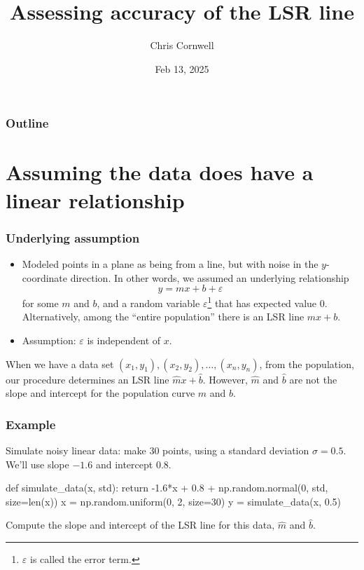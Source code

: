 \documentclass{beamer}
\author{Chris Cornwell}
\date{Feb 13, 2025}
\title{Assessing accuracy of the LSR line}
\newenvironment{codeblock}
    {\hfill\begin{beamerboxesrounded}[lower=codecol, width=0.8\textwidth]
    \medskip

    }
    { 
    \end{beamerboxesrounded}\hfill
    }
\theoremstyle{example}
\begin{document}
\begin{frame}
\titlepage
\end{frame}

\begin{frame}
\frametitle{Outline}
\tableofcontents
\end{frame}

\section{Assuming the data does have a linear relationship}

\begin{frame}
\frametitle{Underlying assumption}
\begin{itemize}
    \item Modeled points in a plane as being from a line, but with noise in the $y$-coordinate direction. In other words, we assumed an underlying relationship 
        \[y = mx + b + \varepsilon\]
    for some $m$ and $b$, and a random variable $\varepsilon$\footnote{$\varepsilon$ is called the error term.} that has expected value 0. Alternatively, among the ``entire population'' there is an LSR line $mx+b$. 
    \pause
    \item Assumption: $\varepsilon$ is independent of $x$.
\end{itemize}

When we have a data set $(x_1,y_1), (x_2,y_2), \ldots, (x_n,y_n)$, from the population, our procedure determines an LSR line $\hat{m}x + \hat{b}$. However, $\hat{m}$ and $\hat{b}$ are not the slope and intercept for the population curve $m$ and $b$.

\end{frame}

\begin{frame}[fragile]
\frametitle{Example}
Simulate noisy linear data: make 30 points, using a standard deviation $\sigma = 0.5$. We'll use slope $-1.6$ and intercept $0.8$.
\pause

\begin{codeblock}

\begin{python}
def simulate_data(x, std):
    return -1.6*x + 0.8 + np.random.normal(0, std, size=len(x))
x = np.random.uniform(0, 2, size=30)
y = simulate_data(x, 0.5)
\end{python}

\end{codeblock}

Compute the slope and intercept of the LSR line for this data, $\hat{m}$ and $\hat{b}$.

\end{frame}
\end{document}
